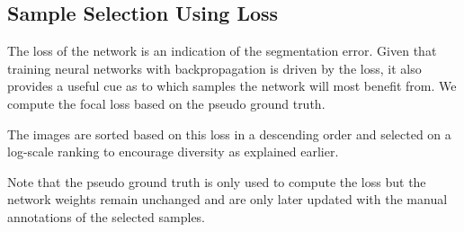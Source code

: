 \documentclass[letterpaper, 10 pt, conference]{ieeeconf}  %
\begin{document}
\subsection{Sample Selection Using Loss} \label{sec:loss}
\label{ssec:loss}

The loss of the network is an indication of the segmentation error. Given that training neural networks with backpropagation is driven by the loss, it also provides a useful cue as to which samples the network will most benefit from. We compute the focal loss \cite{DBLP:conf/iccv/LinGGHD17} based on the pseudo ground truth.

The images are sorted based on this loss in a descending order and selected on a log-scale ranking to encourage diversity as explained earlier.




%

Note that the pseudo ground truth is only used to compute the loss but the network weights remain unchanged and are only later updated with the manual annotations of the selected samples.
\end{document}
